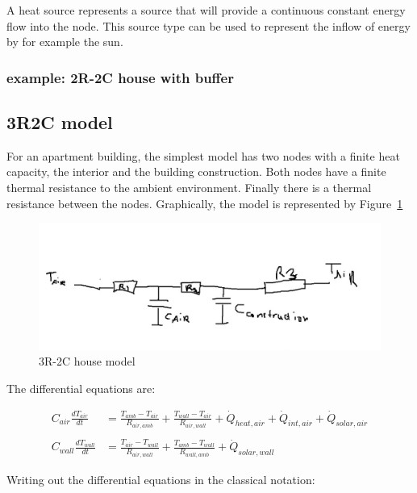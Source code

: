 A heat source represents a source that will provide a continuous constant energy flow into the node. This source type can be used to represent the inflow of energy by for example the sun. 

\subsubsection{example: 2R-2C house with buffer}

   
\subsection{3R2C model}

For an apartment building, the simplest model has two nodes with a finite heat capacity, the interior and the building construction. Both nodes have a finite thermal resistance to the ambient environment. Finally there is a thermal resistance between the nodes. Graphically, the model is represented by Figure~\ref{fig:3R2C}

\begin{figure}[H]
	\centering
	\includegraphics[width=0.7\columnwidth]{Figures/3R2Cmodel}
	\caption[Short title]{3R-2C house model}
	\label{fig:3R2C}
\end{figure} 

The differential equations are:

\begin{equation}
	\begin{aligned}
		C_{air}\frac{dT_{air}}{dt} &=\frac{T_{amb}-T_{air}}{R_{air, amb}} + \frac{T_{wall}-T_{air}}{R_{air, wall}} + \dot{Q}_{heat, air} + \dot{Q}_{int, air} + \dot{Q}_{solar, air} 
		\\ \\
		C_{wall}\frac{dT_{wall}}{dt} &=\frac{T_{air}-T_{wall}}{R_{air, wall}} + \frac{T_{amb}-T_{wall}}{R_{wall, amb}} +\dot{Q}_{solar, wall}
	\end{aligned}
\end{equation}

Writing out the differential equations in the classical notation:

